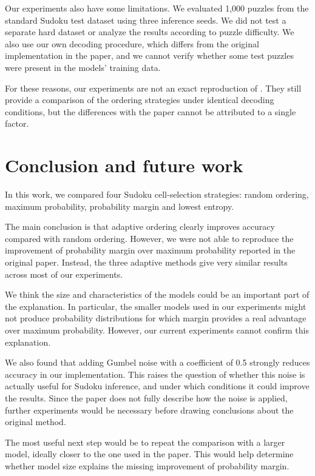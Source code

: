\documentclass{article}
\begin{document}
Our experiments also have some limitations. We evaluated
1,000 puzzles from the standard Sudoku test dataset using
three inference seeds. We did not test a separate hard
dataset or analyze the results according to puzzle difficulty.
We also use our own decoding procedure, which differs from
the original implementation in the paper, and we cannot
verify whether some test puzzles were present in the
models' training data.

For these reasons, our experiments are not an exact
reproduction of \citet{kim2025trainworstplanbest}. They still provide
a comparison of the ordering strategies under identical
decoding conditions, but the differences with the paper
cannot be attributed to a single factor.


\section{Conclusion and future work}
\label{sec:conclusion}

In this work, we compared four Sudoku cell-selection
strategies: random ordering, maximum probability,
probability margin and lowest entropy.

The main conclusion is that adaptive ordering clearly
improves accuracy compared with random ordering. However,
we were not able to reproduce the improvement of probability
margin over maximum probability reported in the original
paper. Instead, the three adaptive methods give very
similar results across most of our experiments.

We think the size and characteristics of the models could
be an important part of the explanation. In particular,
the smaller models used in our experiments might not
produce probability distributions for which margin provides
a real advantage over maximum probability. However,
our current experiments cannot confirm this explanation.

We also found that adding Gumbel noise with a coefficient
of 0.5 strongly reduces accuracy in our implementation.
This raises the question of whether this noise is actually
useful for Sudoku inference, and under which conditions
it could improve the results. Since the paper does not
fully describe how the noise is applied, further experiments
would be necessary before drawing conclusions about
the original method.

The most useful next step would be to repeat the comparison
with a larger model, ideally closer to the one used in
the paper. This would help determine whether model size
explains the missing improvement of probability margin.
\end{document}
